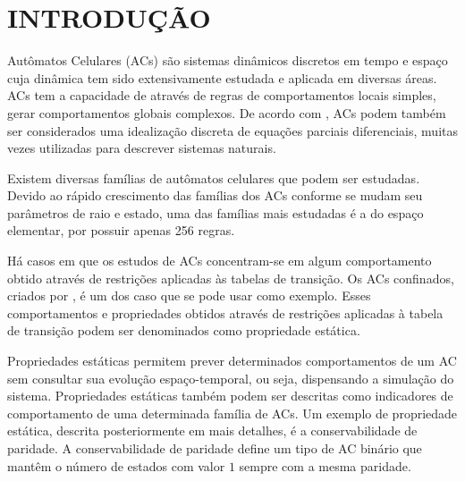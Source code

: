 \documentclass[12pt,a4paper]{article}
\let\stdsection\section
\renewcommand\section{\newpage\stdsection}
\begin{document}


\newpage
\pagestyle{plain}
\renewcommand{\baselinestretch}{1.4} 
\normalsize
\section{INTRODUÇÃO}\label{sec:introducao}
Autômatos Celulares (ACs) são sistemas dinâmicos discretos em tempo e espaço cuja dinâmica tem sido extensivamente estudada e aplicada em diversas áreas. ACs tem a capacidade de através de regras de comportamentos locais simples, gerar comportamentos globais complexos. De acordo com , ACs podem também ser considerados uma idealização discreta de equações parciais diferenciais, muitas vezes utilizadas para descrever sistemas naturais.

Existem diversas famílias de autômatos celulares que podem ser estudadas. Devido ao rápido crescimento das famílias dos ACs conforme se mudam seu parâmetros de raio e estado, uma das famílias mais estudadas é a do espaço elementar, por possuir apenas 256 regras.

Há casos em que os estudos de ACs concentram-se em algum comportamento obtido através de restrições aplicadas às tabelas de transição. Os ACs confinados, criados por , é um dos caso que se pode usar como exemplo. Esses comportamentos e propriedades obtidos através de restrições aplicadas à tabela de transição podem ser denominados como propriedade estática.

Propriedades estáticas permitem prever determinados comportamentos de um AC sem consultar sua evolução espaço-temporal, ou seja, dispensando a simulação do sistema. Propriedades estáticas também podem ser descritas como indicadores de comportamento de uma determinada família de ACs. Um exemplo de propriedade estática, descrita posteriormente em mais detalhes, é a conservabilidade de paridade. A conservabilidade de paridade define um tipo de AC binário que mantêm o número de estados com valor $1$ sempre com a mesma paridade.
\end{document}
